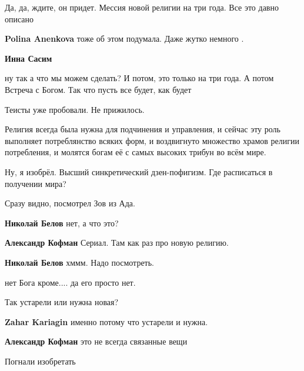 \begin{itemize}

Да, да, ждите, он придет. Мессия новой религии на три года. Все это давно описано

\begin{itemize} %
\textbf{Polina Anenkova} тоже об этом подумала. Даже жутко немного .

\textbf{Инна Сасим} 

ну так а что мы можем сделать? И потом, это только на три года. А потом Встреча
с Богом. Так что пусть все будет, как будет

\end{itemize} %

Теисты уже пробовали. Не прижилось.


Религия всегда была нужна для подчинения и управления, и сейчас эту роль
выполняет потреблянство всяких форм, и воздвигнуто множество храмов религии
потребления, и молятся богам её с самых высоких трибун во всём мире.


Ну, я изобрёл. Высший синкретический дзен-пофигизм.
Где расписаться в получении мира?

Сразу видно, посмотрел Зов из Ада.

\begin{itemize} %
\textbf{Николай Белов} нет, а что это?

\textbf{Александр Кофман} Сериал. Там как раз про новую религию.


\textbf{Николай Белов} хммм. Надо посмотреть.
\end{itemize} %

нет Бога кроме.... да его просто нет.

Так устарели или нужна новая?

\begin{itemize} %
\textbf{Zahar Kariagin} именно потому что устарели и нужна.

\textbf{Александр Кофман} это не всегда связанные вещи
\end{itemize} %

Погнали изобретать


\end{itemize}
